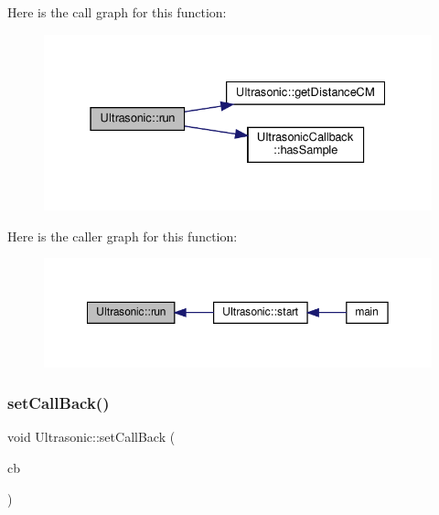 Here is the call graph for this function\+:
\nopagebreak
\begin{figure}[H]
\begin{center}
\leavevmode
\includegraphics[width=331pt]{classUltrasonic_ac1df91b01624260ce4c19126e3aa0160_cgraph}
\end{center}
\end{figure}
Here is the caller graph for this function\+:
\nopagebreak
\begin{figure}[H]
\begin{center}
\leavevmode
\includegraphics[width=350pt]{classUltrasonic_ac1df91b01624260ce4c19126e3aa0160_icgraph}
\end{center}
\end{figure}
\mbox{\label{classUltrasonic_a0b9d6fed8f4d6a207a91f19763ba70fe}} 
\subsubsection{\texorpdfstring{set\+Call\+Back()}{setCallBack()}}
{\footnotesize\ttfamily void Ultrasonic\+::set\+Call\+Back (\begin{DoxyParamCaption}\item[{\hyperlink{classUltrasonicCallback}{Ultrasonic\+Callback} $\ast$}]{cb }\end{DoxyParamCaption})}

